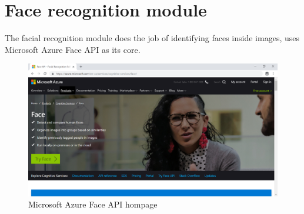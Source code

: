 \section{Face recognition module}
The facial recognition module does the job of identifying faces inside images, uses Microsoft Azure Face API as its core.
\begin{center}
    \begin{figure}[H]
    \centering
    \includegraphics[width=1\columnwidth]{images/chap4/face-api-homepage.PNG}
    \caption{Microsoft Azure Face API hompage}
    \end{figure}
\end{center}
